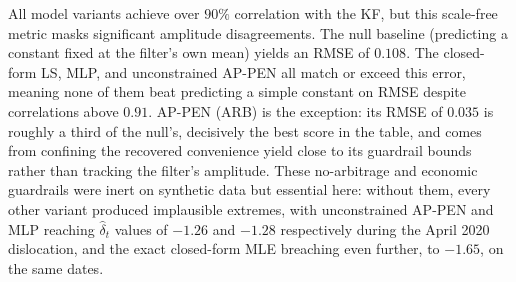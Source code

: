\documentclass[sigconf, authorversion=true, nonacm=true]{acmart}
\begin{document}
All model variants achieve over $90\%$ correlation with the KF, but this scale-free metric masks significant amplitude disagreements. The null baseline (predicting a constant fixed at the filter's own mean) yields an RMSE of $0.108$. The closed-form LS, MLP, and unconstrained AP-PEN all match or exceed this error, meaning none of them beat predicting a simple constant on RMSE despite correlations above $0.91$. AP-PEN (ARB) is the exception: its RMSE of $0.035$ is roughly a third of the null's, decisively the best score in the table, and comes from confining the recovered convenience yield close to its guardrail bounds rather than tracking the filter's amplitude. These no-arbitrage and economic guardrails were inert on synthetic data but essential here: without them, every other variant produced implausible extremes, with unconstrained AP-PEN and MLP reaching $\hat{\delta}_t$ values of $-1.26$ and $-1.28$ respectively during the April 2020 dislocation, and the exact closed-form MLE breaching even further, to $-1.65$, on the same dates.
\end{document}
